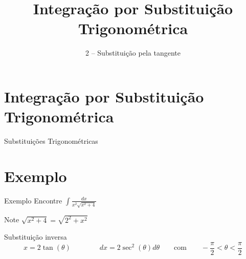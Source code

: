 
\usepackage{integracao_e_series}
\usepackage{ulem}

\title{Integração por Substituição Trigonométrica}
\subtitle{2 -- Substituição pela tangente}



\addtitle

\section{Integração por Substituição Trigonométrica}

\begin{frame}{Substituições Trigonométricas}
\end{frame}

\addtocounter{exemplo}{1}
\section{Exemplo \theexemplo}

\begin{frame}{Exemplo \theexemplo}
  Encontre \(\int \frac{dx}{x^2\sqrt{x^2+4}}\)

  \pause
  \vspace{0.5\baselineskip}
  Note
  \(
    \sqrt{x^2+4} = \sqrt{2^2+x^2}
  \)

  \pause
  \vspace{\baselineskip}
  Substituição inversa
  \[
    x = 2\tan(\theta)
    \qquad\qquad
    dx = 2\sec^2(\theta) d\theta
    \qquad\text{com}\qquad
    -\frac{\pi}{2} < \theta < \frac{\pi}{2}
  \]
\end{frame}

